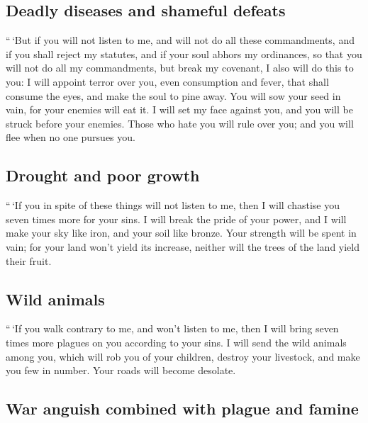 \hypertarget{deadly-diseases-and-shameful-defeats}{%
\subsection{Deadly diseases and shameful
defeats}\label{deadly-diseases-and-shameful-defeats}}

 ``\,`But if you will not listen to me, and will not do
all these commandments,  and if you shall reject my
statutes, and if your soul abhors my ordinances, so that you will not do
all my commandments, but break my covenant,  I also will
do this to you: I will appoint terror over you, even consumption and
fever, that shall consume the eyes, and make the soul to pine away. You
will sow your seed in vain, for your enemies will eat it.
 I will set my face against you, and you will be struck
before your enemies. Those who hate you will rule over you; and you will
flee when no one pursues you.

\hypertarget{drought-and-poor-growth}{%
\subsection{Drought and poor growth}\label{drought-and-poor-growth}}

 ``\,`If you in spite of these things will not listen to
me, then I will chastise you seven times more for your sins.
 I will break the pride of your power, and I will make
your sky like iron, and your soil like bronze.  Your
strength will be spent in vain; for your land won't yield its increase,
neither will the trees of the land yield their fruit.

\hypertarget{wild-animals}{%
\subsection{Wild animals}\label{wild-animals}}

 ``\,`If you walk contrary to me, and won't listen to me,
then I will bring seven times more plagues on you according to your
sins.  I will send the wild animals among you, which will
rob you of your children, destroy your livestock, and make you few in
number. Your roads will become desolate.

\hypertarget{war-anguish-combined-with-plague-and-famine}{%
\subsection{War anguish combined with plague and
famine}\label{war-anguish-combined-with-plague-and-famine}}

